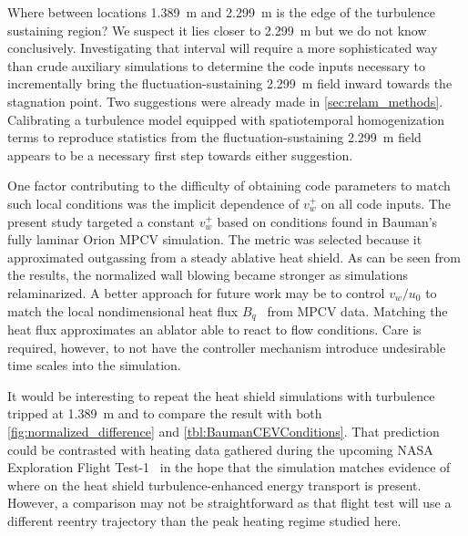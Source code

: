 Where between locations 1.389~m and 2.299~m is the edge of the turbulence
sustaining region?  We suspect it lies closer to 2.299~m but we do not know
conclusively.
%
Investigating that interval will require a more sophisticated way than
crude auxiliary simulations to determine the code inputs necessary to
incrementally bring the
fluctuation-sustaining 2.299~m field inward towards the stagnation point.
%
Two suggestions were already made in \autoref{sec:relam_methods}.
%
%
Calibrating a turbulence model equipped with spatiotemporal homogenization terms
to reproduce statistics from the fluctuation-sustaining 2.299~m field appears to be a
necessary first step towards either suggestion.

One factor contributing to the difficulty of obtaining code parameters to
match such local conditions was the implicit dependence of $v_w^{+}$ on
all code inputs.  The present study targeted a constant $v_w^{+}$ based
on conditions found in Bauman's fully laminar Orion MPCV simulation.
The metric was selected because it approximated outgassing from a
steady ablative heat shield.  As can be seen from the results,
the normalized wall blowing became stronger as simulations relaminarized.
A better approach for future work may be to control $v_w/u_0$ to match the
local nondimensional heat flux $B_q$~\citep{Bradshaw1977Compressible}
from MPCV data.
Matching the heat flux approximates an ablator able to react to flow
conditions.  Care is required, however, to not have the controller
mechanism introduce undesirable time scales into the simulation.

It would be interesting to repeat the \citet{Bauman2011Loose} heat shield
simulations with turbulence tripped at 1.389~m and to compare the result with
both \autoref{fig:normalized_difference} and \autoref{tbl:BaumanCEVConditions}.
That prediction could be contrasted with heating data gathered during the
upcoming NASA Exploration Flight Test-1~\citep{SpaceCom20140317} in the hope
that the simulation matches evidence of where on the heat shield
turbulence-enhanced energy transport is present.
%
However, a comparison may not be straightforward as that flight test will use a
different reentry trajectory than the peak heating regime studied here.

